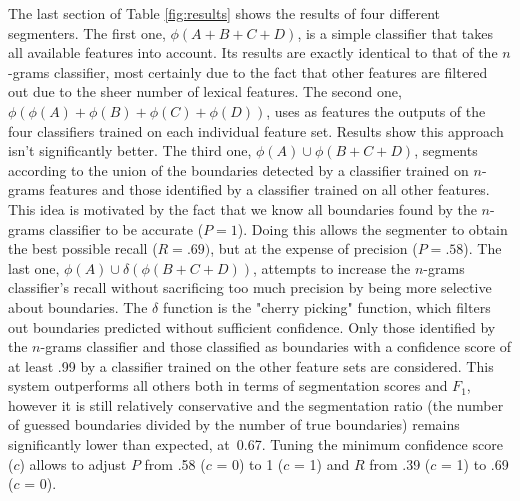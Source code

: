 The last section of Table \ref{fig:results} shows the results of four different segmenters. The first one, $\phi(A + B + C + D)$, is a simple classifier that takes all available features into account. Its results are exactly identical to that of the $n$-grams classifier, most certainly due to the fact that other features are filtered out due to the sheer number of lexical features. The second one, $\phi(\phi(A) + \phi(B) + \phi(C) + \phi(D))$, uses as features the outputs of the four classifiers trained on each individual feature set. Results show this approach isn't significantly better. The third one, $\phi(A) \cup \phi(B + C + D)$, segments according to the union of the boundaries detected by a classifier trained on $n$-grams features and those identified by a classifier trained on all other features. This idea is motivated by the fact that we know all boundaries found by the $n$-grams classifier to be accurate ($P=1$). Doing this allows the segmenter to obtain the best possible recall ($R=.69)$, but at the expense of precision ($P=.58$). The last one, $\phi(A) \cup \delta(\phi(B + C + D))$, attempts to increase the $n$-grams classifier's recall without sacrificing too much precision by being more selective about boundaries. The $\delta$ function is the "cherry picking" function, which filters out boundaries predicted without sufficient confidence. Only those identified by the $n$-grams classifier and those classified as boundaries with a confidence score of at least .99 by a classifier trained on the other feature sets are considered. This system outperforms all others both in terms of segmentation scores and $F_1$, however it is still relatively conservative and the segmentation ratio (the number of guessed boundaries divided by the number of true boundaries) remains significantly lower than expected, at~0.67. Tuning the minimum confidence score ($c$) allows to adjust $P$ from .58 ($c$ = 0) to 1 ($c$ = 1) and $R$ from .39 ($c$ = 1) to .69 ($c$ = 0).